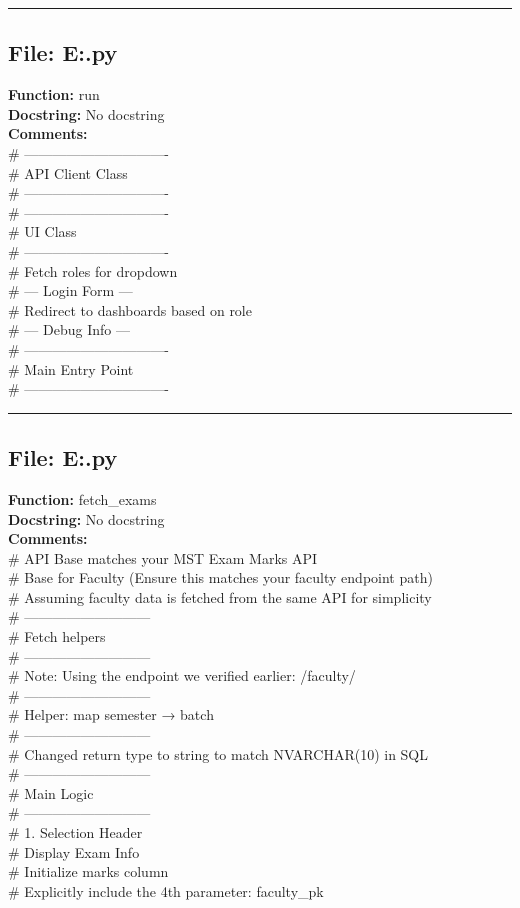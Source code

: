 {\hrule

\subsection*{File: E:\project\capstone\frontend\login.py}
\textbf{Function:} run\\
\textbf{Docstring:} No docstring\\
\textbf{Comments:}\\
# -------------------------------\\
# API Client Class\\
# -------------------------------\\
# -------------------------------\\
# UI Class\\
# -------------------------------\\
# Fetch roles for dropdown\\
# --- Login Form ---\\
# Redirect to dashboards based on role\\
# --- Debug Info ---\\
# -------------------------------\\
# Main Entry Point\\
# -------------------------------\\

\hrule

\subsection*{File: E:\project\capstone\frontend\mem.py}
\textbf{Function:} fetch_exams\\
\textbf{Docstring:} No docstring\\
\textbf{Comments:}\\
# API Base matches your MST Exam Marks API\\
# Base for Faculty (Ensure this matches your faculty endpoint path)\\
# Assuming faculty data is fetched from the same API for simplicity\\
# ---------------------------\\
# Fetch helpers\\
# ---------------------------\\
# Note: Using the endpoint we verified earlier: /faculty/\\
# ---------------------------\\
# Helper: map semester → batch\\
# ---------------------------\\
# Changed return type to string to match NVARCHAR(10) in SQL\\
# ---------------------------\\
# Main Logic\\
# ---------------------------\\
# 1. Selection Header\\
# Display Exam Info\\
# Initialize marks column\\
# Explicitly include the 4th parameter: faculty\_pk\\

}
